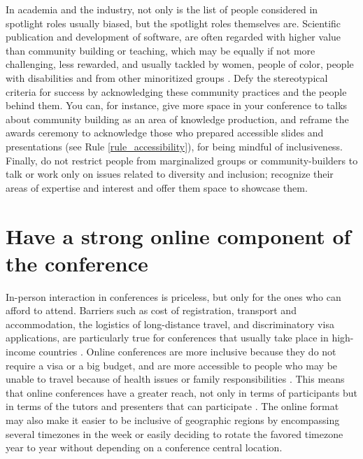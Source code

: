 \documentclass[10pt,letterpaper]{article}
\begin{document}
In academia and the industry, not only is the list of people considered in spotlight roles usually biased, but the spotlight roles themselves are.
Scientific publication and development of software, are often regarded with higher value than community building or teaching, which may be equally if not more challenging, less rewarded, and usually tackled by women, people of color, people with disabilities and from other minoritized groups \cite{cheng2020x+, burfordHomelinessMeantHaving2020}.
Defy the stereotypical criteria for success by acknowledging these community practices and the people behind them.
You can, for instance, give more space in your conference to talks about community building as an area of knowledge production, and reframe  the awards ceremony to acknowledge those who prepared accessible slides and presentations (see Rule \ref{rule_accessibility}), for being mindful of inclusiveness. 
Finally, do not restrict people from marginalized groups or community-builders to talk or work only on issues related to diversity and inclusion; recognize their areas of expertise and interest and offer them space to showcase them. 

\section{Have a strong online component of the conference} 
\label{rule_online}

In-person interaction in conferences is priceless, but only for the ones who can afford to attend. 
Barriers such as cost of registration, transport and accommodation, the logistics of long-distance travel, and discriminatory visa applications, are particularly true for conferences that usually take place in high-income countries \cite{arendDisparityConferenceRegistration2019,gewinWhatScientistsShould2019,jooKeepOnlineOption2021}. 
Online conferences are more inclusive because they do not require a visa or a big budget, and are more accessible to people who may be unable to travel because of health issues or family responsibilities \cite{salibaGettingGripsOnline2020}.
This means that online conferences have a greater reach, not only in terms of participants but in terms of the tutors and presenters that can participate \cite{atkinsonJournalMedicine20202021, roosOnlineConferencesNew2020, jooKeepOnlineOption2021}.
The online format may also make it easier to be inclusive of geographic regions by encompassing several timezones in the week or easily deciding to rotate the favored timezone year to year without depending on a conference central location. 
\end{document}
